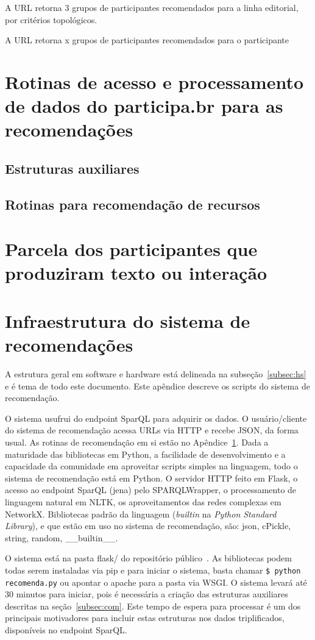 \documentclass[12pt]{article}
\begin{document}
A URL \url{} retorna 3 grupos de participantes recomendados para a linha editorial, por critérios topológicos.

A URL \url{} retorna x grupos de participantes recomendados para o participante

\section{Rotinas de acesso e processamento de dados do participa.br para as recomendações}\label{sec:algs}
\subsection{Estruturas auxiliares}

\subsection{Rotinas para recomendação de recursos}

\section{Parcela dos participantes que produziram texto ou interação}

\section{Infraestrutura do sistema de recomendações}\label{sec:infra}
A estrutura geral em software e hardware está delineada na subseção~\ref{subsec:hs}
e é tema de todo este documento. Este apêndice descreve os scripts
do sistema de recomendação.

O sistema usufrui do endpoint SparQL para adquirir os dados. O usuário/cliente
do sistema de recomendação acessa URLs via HTTP e recebe JSON, da forma usual.
As rotinas de recomendação em si estão no Apêndice~\ref{sec:algs}. Dada a maturidade
das bibliotecas em Python, a facilidade de desenvolvimento e a capacidade
da comunidade em aproveitar scripts simples na linguagem, todo o sistema de recomendação
está em Python. O servidor HTTP feito em Flask, o acesso ao endpoint SparQL (jena) pelo
SPARQLWrapper, o processamento de linguagem natural em NLTK, os aproveitamentos
das redes complexas em NetworkX. Bibliotecas padrão da linguagem (\emph{builtin} na \emph{Python Standard Library}),
e que estão em uso no sistema de recomendação,
são: json, cPickle, string, random, \_\_builtin\_\_.

O sistema está na pasta flask/ do repositório público~\cite{repoProd4}.
As bibliotecas podem todas serem instaladas via pip e para iniciar o sistema,
basta chamar \texttt{\$ python recomenda.py} ou apontar o apache para a pasta via WSGI.
O sistema levará até 30 minutos para iniciar, pois é necessária a criação das estruturas auxiliares
descritas na seção~\ref{subsec:com}. Este tempo de espera para processar é um dos principais motivadores para incluir estas estruturas nos dados triplificados, disponíveis no endpoint SparQL.
\end{document}
